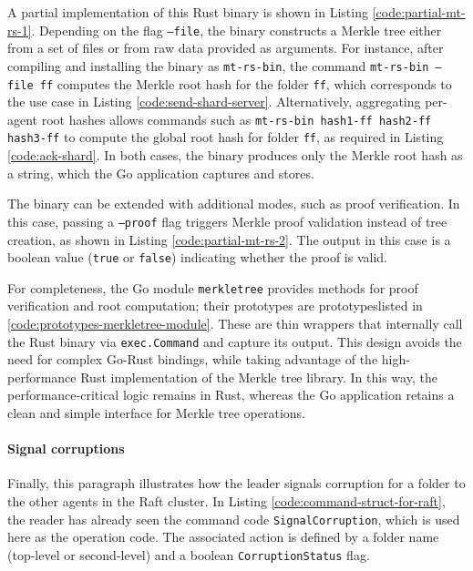 A partial implementation of this Rust binary is shown in Listing
\ref{code:partial-mt-rs-1}. Depending on the flag \texttt{--file}, the binary constructs a 
Merkle tree either from a set of files or from raw data provided as arguments. For instance, 
after compiling and installing the binary as \texttt{mt-rs-bin}, the command 
\texttt{mt-rs-bin --file ff} computes the Merkle root hash for the folder \texttt{ff}, 
which corresponds to the use case in Listing \ref{code:send-shard-server}. Alternatively, 
aggregating per-agent root hashes allows commands such as 
\texttt{mt-rs-bin hash1-ff hash2-ff hash3-ff} to compute the global root hash for folder 
\texttt{ff}, as required in Listing \ref{code:ack-shard}. In both cases, the binary 
produces only the Merkle root hash as a string, which the Go application captures and stores.  

The binary can be extended with additional modes, such as proof verification. 
In this case, passing a \texttt{--proof} flag triggers Merkle proof validation instead of 
tree creation, as shown in Listing \ref{code:partial-mt-rs-2}. The output in this case is 
a boolean value (\texttt{true} or \texttt{false}) indicating whether the proof is valid.  

For completeness, the Go module \texttt{merkletree} provides methods for 
proof verification and root computation; their prototypes are prototypeslisted in \ref{code:prototypes-merkletree-module}. 
These are thin wrappers that internally call the Rust binary via 
\texttt{exec.Command} and capture its output. This design avoids the need for 
complex Go-Rust bindings, while taking advantage of the high-performance Rust 
implementation of the Merkle tree library. In this way, the performance-critical 
logic remains in Rust, whereas the Go application retains a clean and simple 
interface for Merkle tree operations.  

\paragraph{Signal corruptions}

Finally, this paragraph illustrates how the leader signals corruption for a folder
to the other agents in the Raft cluster. In Listing
\ref{code:command-struct-for-raft}, the reader has already seen the command code
\texttt{SignalCorruption}, which is used here as the operation code. The
associated action is defined by a folder name (top-level or second-level) and a
boolean \texttt{CorruptionStatus} flag.

